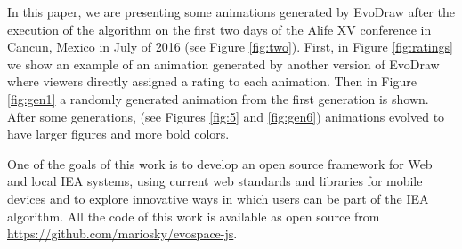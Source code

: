 \documentclass[letterpaper]{article}
\begin{document}
In this paper, we are presenting some animations generated by EvoDraw after the
execution of the algorithm on the first two days of the Alife XV conference in
Cancun, Mexico in July of 2016 (see Figure \ref{fig:two}). First, in Figure
\ref{fig:ratings} we show an example of an animation generated by another version
of EvoDraw where viewers directly assigned a rating to each animation. Then in
Figure \ref{fig:gen1} a randomly generated animation from the first generation
is shown. After some generations, (see Figures \ref{fig:5} and \ref{fig:gen6})
animations evolved to have larger figures and more bold colors.
 
One of the  goals of this work is to develop an open source framework for Web
and local IEA systems, using current web standards and libraries for mobile
devices and to explore  innovative ways in which users can be part of the IEA
algorithm. All the code of this work is available as open source from
\url{https://github.com/mariosky/evospace-js}. 




\end{document}
